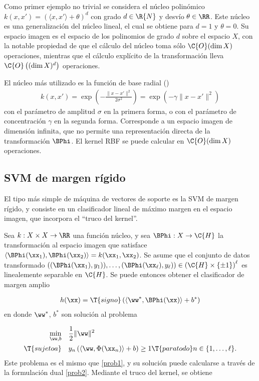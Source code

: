 Como primer ejemplo no trivial se considera el núcleo polinómico
$k(x,x')=\left(\langle{}x,x'\rangle+\theta\right)^d$ con grado
$d\in\R{N}$ y desvío $\theta\in\RR$. Este núcleo es una generalización
del núcleo lineal, el cual se obtiene para $d=1$ y $\theta=0$. Su
espacio imagen es el espacio de los polinomios de grado $d$ sobre el
espacio $X$, con la notable propiedad de que el cálculo del núcleo
toma sólo $\C{O}(\dim{}X)$ operaciones, mientras que el cálculo
explícito de la transformación lleva $\C{O}\left((\dim{}X)^d\right)$
operaciones.

El núcleo más utilizado es la función de base radial
()
%
\begin{align}
  k(x,x')=\exp\left(-\frac{\|x-x'\|^2}{2\sigma^2}\right)
  =\exp\left(-\gamma\|x-x'\|^2\right)
\end{align}
%
con el parámetro de amplitud $\sigma$ en la primera forma, o con el
parámetro de concentración $\gamma$ en la segunda forma. Corresponde a
un espacio imagen de dimensión infinita, que no permite una
representación directa de la transformación $\BPhi$.  El kernel RBF se
puede calcular en $\C{O}(\dim{}X)$ operaciones.
%
%
\subsection{SVM de margen rígido}
%
El tipo más simple de máquina de vectores de soporte es la SVM de
margen rígido, y consiste en un clasificador lineal de máximo margen
en el espacio imagen, que incorpora el ``truco del kernel''.

Sea $k:X\times{}X\rightarrow\RR$ una función núcleo, y sea
$\BPhi:X\rightarrow\C{H}$ la transformación al espacio imagen que
satisface
$\left\langle\BPhi(\xx_1),\BPhi(\xx_2)\right\rangle=k(\xx_1,\xx_2)$.
Se asume que el conjunto de datos transformado
$\left((\BPhi(\xx_1),y_1)),\ldots,(\BPhi(\xx_\ell),y_\ell)\right)
\in\left(\C{H}\times\{\pm1\}\right)^\ell$ es linealemente separable en
$\C{H}$.  Se puede entonces obtener el clasificador de margen amplio

\begin{align}
  h(\xx)=\T{signo}\left(\langle\ww^*,\BPhi(\xx)\rangle+b^*\right)
\end{align}
en donde $\ww^*$, $b^*$ son solución al problema

\begin{align}
\label{svm-hardmargin}
  \begin{split}
    \min_{\ww,b} \quad & \frac{1}{2}\|\ww\|^2\\
    \T{sujeto a}\quad & y_n\left(\langle\ww,\Phi(\xx_n)\rangle+b\right)
    \geq 1 \T{ para todo } n\in\{1,\ldots,\ell\}.
  \end{split}
\end{align}
Este problema es el mismo que \autoref{prob1}, y su solución puede
calcularse a través de la formulación dual \autoref{prob2}. Mediante el
truco del kernel, se obtiene

